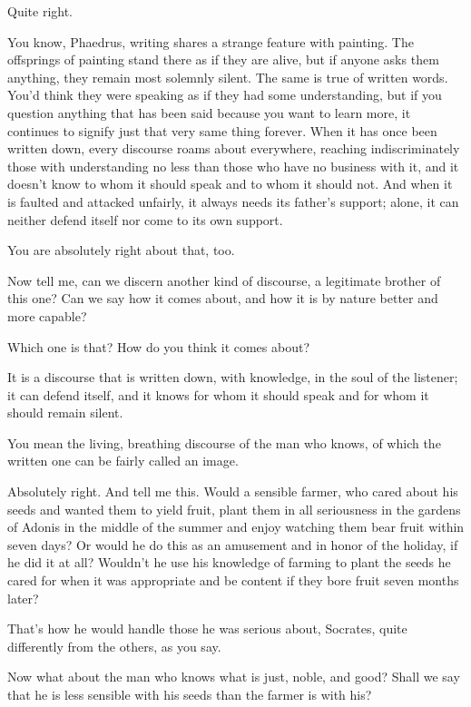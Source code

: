 \sayphaedrus Quite right.

\saysocrates You know, Phaedrus, writing shares a strange feature with
painting. The offsprings of painting stand there as if they are alive,
but if anyone asks them anything, they remain most solemnly silent. The
same is true of written words. You'd think they were speaking as if they
had some understanding, but if you question anything that has been said
because you want to learn more, it continues to signify just that very
same thing forever. When it has once been written down, every
discourse roams about everywhere, reaching indiscriminately those with
understanding no less than those who have no business with it, and it
doesn't know to whom it should speak and to whom it should not. And when
it is faulted and attacked unfairly, it always needs its father's
support; alone, it can neither defend itself nor come to its own
support.

\sayphaedrus You are absolutely right about that, too.

\saysocrates Now tell me, can we discern another kind of
discourse, a legitimate brother of this one? Can we say how it comes
about, and how it is by nature better and more capable?

\sayphaedrus Which one is that? How do you think it comes about?

\saysocrates It is a discourse that is written down, with knowledge, in the
soul of the listener; it can defend itself, and it knows for whom it
should speak and for whom it should remain silent.

\sayphaedrus You mean the living, breathing discourse of the man who knows,
of which the written one can be fairly called an image.

\saysocrates Absolutely right. And tell me this. Would a sensible farmer, 
who cared about his seeds and wanted them to yield fruit, plant
them in all seriousness in the gardens of Adonis in the middle of the
summer and enjoy watching them bear fruit within seven days? Or would he
do this as an amusement and in honor of the holiday, if he did it at
all? Wouldn't he use
his knowledge of farming to plant the seeds he cared for when it was
appropriate and be content if they bore fruit seven months later?

\sayphaedrus That's how he would handle those he was serious about, 
Socrates, quite differently from the others, as you say.

\saysocrates Now what about the man who knows what is just, noble, and
good? Shall we say that he is less sensible with his seeds than the
farmer is with his?

